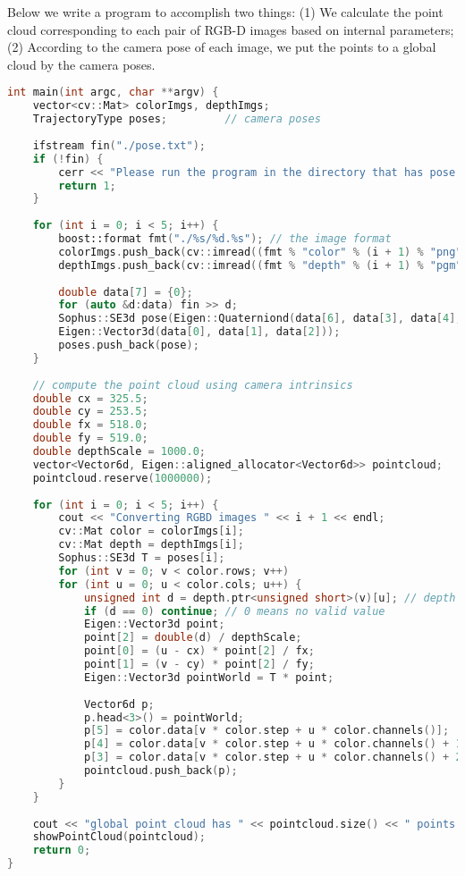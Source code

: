 Below we write a program to accomplish two things: (1) We calculate the point cloud corresponding to each pair of RGB-D images based on internal parameters; (2) According to the camera pose of each image, we put the points to a global cloud by the camera poses.

\begin{lstlisting}[language=C++,caption=slambook/ch5/rgbd/jointMap.cpp (Part)]
int main(int argc, char **argv) {
    vector<cv::Mat> colorImgs, depthImgs;
    TrajectoryType poses;         // camera poses
    
    ifstream fin("./pose.txt");
    if (!fin) {
        cerr << "Please run the program in the directory that has pose.txt" << endl;
        return 1;
    }
    
    for (int i = 0; i < 5; i++) {
        boost::format fmt("./%s/%d.%s"); // the image format
        colorImgs.push_back(cv::imread((fmt % "color" % (i + 1) % "png").str()));
        depthImgs.push_back(cv::imread((fmt % "depth" % (i + 1) % "pgm").str(), -1)); // use -1 flag to load the depth image
        
        double data[7] = {0};
        for (auto &d:data) fin >> d;
        Sophus::SE3d pose(Eigen::Quaterniond(data[6], data[3], data[4], data[5]),
        Eigen::Vector3d(data[0], data[1], data[2]));
        poses.push_back(pose);
    }
    
    // compute the point cloud using camera intrinsics
    double cx = 325.5;
    double cy = 253.5;
    double fx = 518.0;
    double fy = 519.0;
    double depthScale = 1000.0;
    vector<Vector6d, Eigen::aligned_allocator<Vector6d>> pointcloud;
    pointcloud.reserve(1000000);
    
    for (int i = 0; i < 5; i++) {
        cout << "Converting RGBD images " << i + 1 << endl;
        cv::Mat color = colorImgs[i];
        cv::Mat depth = depthImgs[i];
        Sophus::SE3d T = poses[i];
        for (int v = 0; v < color.rows; v++)
        for (int u = 0; u < color.cols; u++) {
            unsigned int d = depth.ptr<unsigned short>(v)[u]; // depth value is 16-bit
            if (d == 0) continue; // 0 means no valid value
            Eigen::Vector3d point;
            point[2] = double(d) / depthScale;
            point[0] = (u - cx) * point[2] / fx;
            point[1] = (v - cy) * point[2] / fy;
            Eigen::Vector3d pointWorld = T * point;
            
            Vector6d p;
            p.head<3>() = pointWorld;
            p[5] = color.data[v * color.step + u * color.channels()];   // blue
            p[4] = color.data[v * color.step + u * color.channels() + 1]; // green
            p[3] = color.data[v * color.step + u * color.channels() + 2]; // red
            pointcloud.push_back(p);
        }
    }
    
    cout << "global point cloud has " << pointcloud.size() << " points." << endl;
    showPointCloud(pointcloud);
    return 0;
}
\end{lstlisting}


